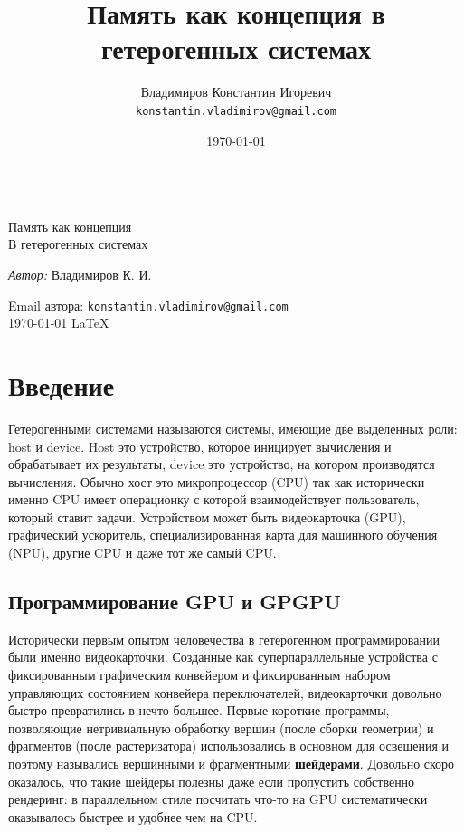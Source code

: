 \documentclass[a4paper,12pt,oneside]{article}
\title{Память как концепция в гетерогенных системах}
\author{
  Владимиров Константин Игоревич\\
  \texttt{konstantin.vladimirov@gmail.com}
}
\date{\today}
\begin{document}
\begin{titlepage}
\begin{center}

\large ~ \\[4.5cm]

\huge Память как концепция\\[0.6cm]
\large В гетерогенных системах\\[3.7cm]

\begin{minipage}{0.5\textwidth}
\begin{flushleft}
\emph{Автор:} Владимиров К. И.\\
\end{flushleft}
\end{minipage}
\vfill
Email автора: \texttt{konstantin.vladimirov@gmail.com}\\
{\large \today}
{\large \LaTeX}

\end{center}
\thispagestyle{empty}
\end{titlepage}

\tableofcontents

\pagebreak
\section{Введение}\label{sec:Intro}

Гетерогенными системами называются системы, имеющие две выделенных роли: host и device. Host это устройство, которое иницирует вычисления и обрабатывает их результаты, device это устройство, на котором производятся вычисления.
Обычно хост это микропроцессор (CPU) так как исторически именно CPU имеет операционку с которой взаимодействует пользователь, который ставит задачи.
Устройством может быть видеокарточка (GPU), графический ускоритель, специализированная карта для машинного обучения (NPU), другие CPU и даже тот же самый CPU.

\subsection{Программирование GPU и GPGPU}\label{subsec:gpgpu}

Исторически первым опытом человечества в гетерогенном программировании были именно видеокарточки.
Созданные как суперпараллельные устройства с фиксированным графическим конвейером и фиксированным набором управляющих состоянием конвейера переключателей, видеокарточки довольно быстро превратились в нечто большее.
Первые короткие программы, позволяющие нетривиальную обработку вершин (после сборки геометрии) и фрагментов (после растеризатора) использовались в основном для освещения и поэтому назывались вершинными и фрагментными \textbf{шейдерами}.
Довольно скоро оказалось, что такие шейдеры полезны даже если пропустить собственно рендеринг: в параллельном стиле посчитать что-то на GPU систематически оказывалось быстрее и удобнее чем на CPU.
\end{document}
